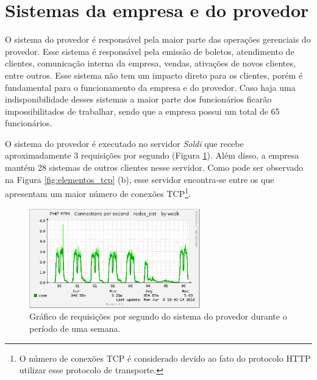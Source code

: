 \section{Sistemas da empresa e do provedor}
\label{section:sistemas}

O sistema do provedor é responsável pela maior parte das operações gerenciais do provedor. Esse sistema é responsável pela emissão de 
boletos, atendimento de clientes, comunicação interna da empresa, vendas, ativações de novos clientes, entre outros. Esse sistema não tem um 
impacto direto para os clientes, porém é fundamental para o funcionamento da empresa e do provedor. Caso haja uma indisponibilidade desses sistemas 
a maior parte dos funcionários ficarão impossibilitados de trabalhar, sendo que a empresa possui um total de 65 funcionários.

O sistema do provedor é executado no servidor \textit{Soldi} que recebe aproximadamente 3 requisições  por segundo
(Figura \ref{fig:soldi_week}). Além disso, a empresa mantém 28 sistemas de outros clientes nesse servidor. 
Como pode ser observado na Figura \ref{fig:elementos_tcp} (b), esse servidor encontra-se entre os que apresentam um maior número de conexões 
\ac{TCP}\footnote[1]{O número de conexões \ac{TCP} é considerado devido ao fato do protocolo \ac{HTTP} utilizar esse 
protocolo de transporte.}.


\begin{figure}[h!]
 \centering
 \includegraphics[width=280px]{img/soldi_week.eps}
 \caption{Gráfico de requisições por segundo do sistema do provedor durante o período de uma semana.}
 \label{fig:soldi_week}
\end{figure}

